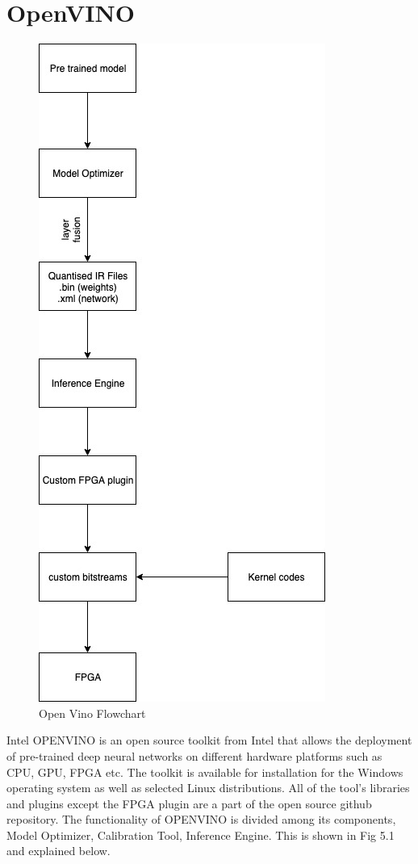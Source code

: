 \documentclass[titlepage]{report}
\begin{document}
\section{OpenVINO}
\begin{figure}[!]
    \centering
    \includegraphics[scale=0.65]{open_vino_flowchart.jpg}
    \caption{Open Vino Flowchart}
\end{figure}

Intel OPENVINO is an open source toolkit from Intel that allows the deployment of pre-trained deep neural networks on different hardware platforms such as CPU, GPU, FPGA etc. The toolkit is available for installation for the Windows operating system as well as selected Linux distributions. All of the tool's libraries and plugins except the FPGA plugin are a part of the open source github repository.
The functionality of OPENVINO is divided among its components, Model Optimizer, Calibration Tool,  Inference Engine. This is shown in Fig 5.1 and explained below. 
\end{document}
